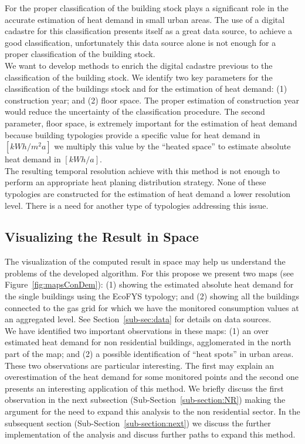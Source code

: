 For the proper classification of the building stock plays a significant role in
the accurate estimation of heat demand in small urban areas. The use of a
digital cadastre for this classification presents itself as a great data
source, to achieve a good classification, unfortunately this data source alone
is not enough for a proper classification of the building stock.\\

We want to develop methods to enrich the digital cadastre previous to the
classification of the building stock. We identify two key parameters for the
classification of the buildings stock and for the estimation of heat demand:
(1) construction year; and (2) floor space.  The proper estimation of
construction year would reduce the uncertainty of the classification procedure.
The second parameter, floor space, is extremely important for the estimation of
heat demand because building typologies provide a specific value for heat
demand in $[kWh/m^2a]$ we multiply this value by the ``heated space'' to
estimate absolute heat demand in $[kWh/a]$.\\

The resulting temporal resolution achieve with this method is not enough to
perform an appropriate heat planing distribution strategy. None of these
typologies are constructed for the estimation of heat demand a lower resolution
level. There is a need for another type of typologies addressing this issue.\\

\subsection{Visualizing the Result in Space}

The visualization of the computed result in space may help us understand the
problems of the developed algorithm.  For this propose we present two maps (see
Figure~\ref{fig:mapsConDem}): (1) showing the estimated absolute heat demand
for the single buildings using the EcoFYS typology; and (2) showing all the
buildings connected to the gas grid for which we have the monitored consumption
values at an aggregated level.  See Section~\ref{sub-sec:data} for details on
data sources.\\

We have identified two important observations in these maps: (1) an over
estimated heat demand for non residential buildings, agglomerated in the north
part of the map; and (2) a possible identification of ``heat spots'' in urban
areas.  These two observations are particular interesting. The first may
explain an overestimation of the heat demand for some monitored points
and the second one presents an interesting application of this method.  We
briefly discuss the first observation in the next subsection
(Sub-Section~\ref{sub-section:NR}) making the argument for the need to expand
this analysis to the non residential sector.  In the subsequent section
(Sub-Section~\ref{sub-section:next}) we discuss the further implementation of
the analysis and discuss further paths to expand this method.\\
